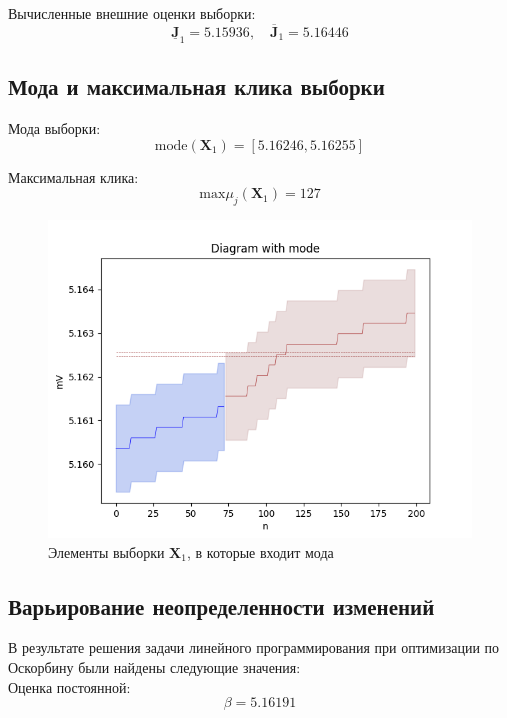 Вычисленные внешние оценки выборки: 
\begin{equation*}
	\underline{\bm{J}}_1 = 5.15936 , \quad \overline{\bm{J}}_1 = 5.16446
\end{equation*}
\subsection{Мода и максимальная клика выборки} 

Мода выборки: 
\begin{equation*}
	\text{mode}(\bm{X}_1) = [5.16246, 5.16255]
\end{equation*}

Максимальная клика: 
\begin{equation*}
	\text{max} \mu_j (\bm{X}_1) = 127
\end{equation*}

\begin{figure}[H]
	\begin{center}
		\includegraphics[scale = 0.55]{diagram_with_mode.png}
	\end{center}
	\caption{Элементы выборки $\bm{X}_1$, в которые входит мода}
\end{figure}

\subsection{Варьирование неопределенности изменений}

В результате решения задачи линейного программирования при оптимизации по Оскорбину были найдены следующие значения: \\
Оценка постоянной: 
\begin{equation*}
	\beta = 5.16191
\end{equation*}

